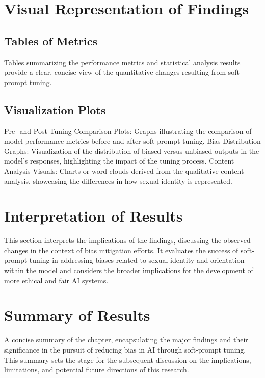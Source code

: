 \section{Visual Representation of Findings}

\subsection{Tables of Metrics}

Tables summarizing the performance metrics and statistical analysis results provide a clear, concise view of the quantitative changes resulting from soft-prompt tuning.

\subsection{Visualization Plots}

Pre- and Post-Tuning Comparison Plots: Graphs illustrating the comparison of model performance metrics before and after soft-prompt tuning.
Bias Distribution Graphs: Visualization of the distribution of biased versus unbiased outputs in the model's responses, highlighting the impact of the tuning process.
Content Analysis Visuals: Charts or word clouds derived from the qualitative content analysis, showcasing the differences in how sexual identity is represented.
\section{Interpretation of Results}

This section interprets the implications of the findings, discussing the observed changes in the context of bias mitigation efforts. It evaluates the success of soft-prompt tuning in addressing biases related to sexual identity and orientation within the model and considers the broader implications for the development of more ethical and fair AI systems.

\section{Summary of Results}

A concise summary of the chapter, encapsulating the major findings and their significance in the pursuit of reducing bias in AI through soft-prompt tuning. This summary sets the stage for the subsequent discussion on the implications, limitations, and potential future directions of this research.